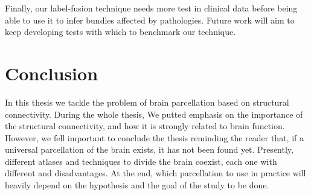Finally, our label-fusion technique needs more test in clinical data before
being able to use it to infer bundles affected by pathologies. Future work
will aim to keep developing tests with which to benchmark our technique.

\section{Conclusion}
In this thesis we tackle the problem of brain parcellation based on structural
connectivity. During the whole thesis, We putted emphasis on the importance
of the structural connectivity, and how it is strongly related to brain function.
However, we fell important to conclude the thesis reminding the reader that,
if a universal parcellation of the brain exists, it has not been found yet.
Presently, different atlases and techniques to divide the brain coexist, each
one with different and disadvantages. At the end, which parcellation to use in
practice will heavily depend on the hypothesis and the goal of the study to be
done.


%
%
% 

%


